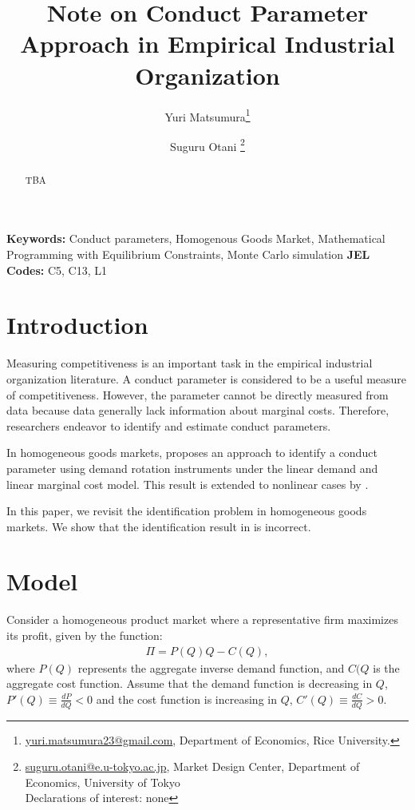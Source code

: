 \documentclass[11pt, a4paper]{article}
\title{Note on Conduct Parameter Approach in Empirical Industrial Organization}
\author{Yuri Matsumura\thanks{\href{mailto:}{yuri.matsumura23@gmail.com}, Department of Economics, Rice University.} \and Suguru Otani \thanks{\href{mailto:}{suguru.otani@e.u-tokyo.ac.jp}, Market Design Center, Department of Economics, University of Tokyo
\\Declarations of interest: none %
}}
\theoremstyle{remark}
\begin{document}
\maketitle
\begin{abstract}
    TBA
\end{abstract}

\noindent\textbf{Keywords:} Conduct parameters, Homogenous Goods Market, Mathematical Programming with Equilibrium Constraints, Monte Carlo simulation
\vspace{0in}
\newline
\noindent\textbf{JEL Codes:} C5, C13, L1

\bigskip





\section{Introduction}
Measuring competitiveness is an important task in the empirical industrial organization literature.
A conduct parameter is considered to be a useful measure of competitiveness. 
However, the parameter cannot be directly measured from data because data generally lack information about marginal costs.
Therefore, researchers endeavor to identify and estimate conduct parameters.


In homogeneous goods markets, \citet{bresnahan1982oligopoly} proposes an approach to identify a conduct parameter using demand rotation instruments under the linear demand and linear marginal cost model.
This result is extended to nonlinear cases by \citet{lau1982identifying}.

In this paper, we revisit the identification problem in homogeneous goods markets.
We show that the identification result in \citet{lau1982identifying} is incorrect.

















\section{Model}
Consider a homogeneous product market where a representative firm maximizes its profit, given by the function:
\begin{align}
    \Pi = P(Q)Q - C(Q),
\end{align}
where $P(Q)$ represents the aggregate inverse demand function, and $C(Q$ is the aggregate cost function.
Assume that the demand function is decreasing in $Q$, $P'(Q) \equiv \frac{dP}{dQ} < 0$ and the cost function is increasing in $Q$, $C'(Q) \equiv \frac{dC}{dQ} > 0$.
\end{document}
